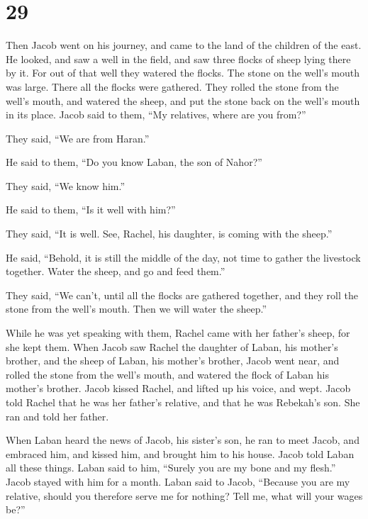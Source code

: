 \hypertarget{section-28}{%
\section{29}\label{section-28}}

 Then Jacob went on his journey, and came to the land of
the children of the east.  He looked, and saw a well in
the field, and saw three flocks of sheep lying there by it. For out of
that well they watered the flocks. The stone on the well's mouth was
large.  There all the flocks were gathered. They rolled
the stone from the well's mouth, and watered the sheep, and put the
stone back on the well's mouth in its place.  Jacob said
to them, ``My relatives, where are you from?''

They said, ``We are from Haran.''

 He said to them, ``Do you know Laban, the son of Nahor?''

They said, ``We know him.''

 He said to them, ``Is it well with him?''

They said, ``It is well. See, Rachel, his daughter, is coming with the
sheep.''

 He said, ``Behold, it is still the middle of the day, not
time to gather the livestock together. Water the sheep, and go and feed
them.''

 They said, ``We can't, until all the flocks are gathered
together, and they roll the stone from the well's mouth. Then we will
water the sheep.''

 While he was yet speaking with them, Rachel came with her
father's sheep, for she kept them.  When Jacob saw Rachel
the daughter of Laban, his mother's brother, and the sheep of Laban, his
mother's brother, Jacob went near, and rolled the stone from the well's
mouth, and watered the flock of Laban his mother's brother.
 Jacob kissed Rachel, and lifted up his voice, and wept.
 Jacob told Rachel that he was her father's relative, and
that he was Rebekah's son. She ran and told her father.

 When Laban heard the news of Jacob, his sister's son, he
ran to meet Jacob, and embraced him, and kissed him, and brought him to
his house. Jacob told Laban all these things.  Laban said
to him, ``Surely you are my bone and my flesh.'' Jacob stayed with him
for a month.  Laban said to Jacob, ``Because you are my
relative, should you therefore serve me for nothing? Tell me, what will
your wages be?''

